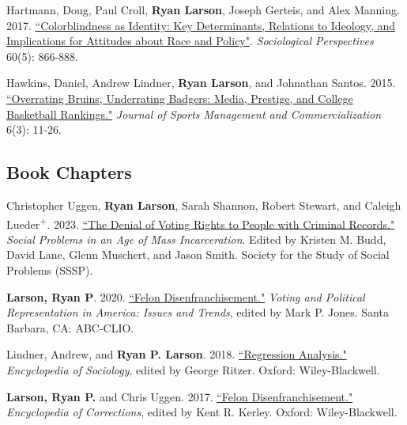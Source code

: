 \documentclass[letterpaper]{article}
\renewenvironment{itemize}{
  \begin{list}{}{
    \setlength{\leftmargin}{1.5em}
  }
}{
  \end{list}
}
\begin{document}
\begin{itemize}
\item Hartmann, Doug, Paul Croll, \textbf{Ryan Larson}, Joseph Gerteis, and  Alex Manning. 2017. \href{https://ryanplarson.github.io/personal_site/pubs/hartmann_etal_17.pdf}{``Colorblindness as Identity:  Key Determinants, Relations to Ideology, and Implications for Attitudes about Race and Policy"}. \textit{Sociological Perspectives} 60(5): 866-888.

\item Hawkins, Daniel, Andrew Lindner, \textbf{Ryan Larson}, and Johnathan Santos. 2015. \href{https://ryanplarson.github.io/personal_site/pubs/hawkins_etal_15.pdf}{``Overrating Bruins, Underrating Badgers: Media, Prestige, and College Basketball Rankings."} \textit{Journal of Sports Management and Commercialization} 6(3): 11-26.

\end{itemize}

\subsection*{Book Chapters}

\begin{itemize}

\item Christopher Uggen, \textbf{Ryan Larson}, Sarah Shannon, Robert Stewart, and Caleigh Lueder\textsuperscript{+}. 2023. \href{https://ryanplarson.github.io/personal_site/pubs/uggen_etal_23.pdf}{``The Denial of Voting Rights to People with Criminal Records."} \textit{Social Problems in an Age of Mass Incarceration}. Edited by Kristen M. Budd, David Lane, Glenn Muschert, and Jason Smith. Society for the Study of Social Problems (SSSP).

\item \textbf{Larson, Ryan P}. 2020. \href{https://ryanplarson.github.io/personal_site/pubs/larson_19.pdf}{``Felon Disenfranchisement."} \textit{Voting and Political Representation in America: Issues and Trends}, edited by Mark P. Jones. Santa Barbara, CA: ABC-CLIO.

\item Lindner, Andrew, and \textbf{Ryan P. Larson}. 2018. \href{https://ryanplarson.github.io/personal_site/pubs/lindner_larson_18.pdf}{``Regression Analysis."} \textit{Encyclopedia of Sociology}, edited by George Ritzer. Oxford: Wiley-Blackwell.

\item \textbf{Larson, Ryan P.} and Chris Uggen. 2017. \href{https://ryanplarson.github.io/personal_site/pubs/uggen_larson_17.pdf}{``Felon Disenfranchisement."} \textit{Encyclopedia of Corrections}, edited by Kent R. Kerley. Oxford: Wiley-Blackwell.

\end{itemize}
\end{document}
